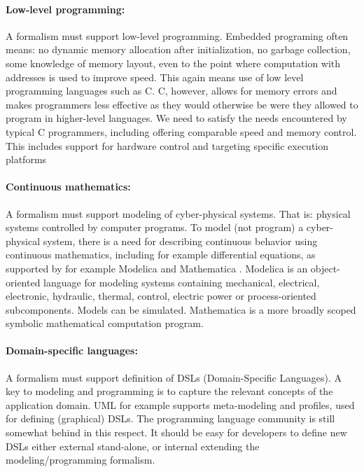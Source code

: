 \paragraph{Low-level programming:}

A formalism must support low-level programming.
Embedded programing often means: no dynamic memory 
allocation after initialization, no garbage collection, some 
knowledge of memory layout, even to the point where computation 
with addresses is used to improve speed. This again means use of 
low level programming languages such as C. C, however, allows for 
memory errors and makes programmers less effective as they would 
otherwise be were they allowed to program in higher-level 
languages. We need to satisfy the needs encountered by typical C 
programmers, including offering comparable speed and memory 
control. This includes support for hardware control and
targeting specific execution platforms 


\paragraph{Continuous mathematics:}

A formalism must support modeling of cyber-physical systems. That
is: physical systems controlled by computer programs. To model (not program) a cyber-physical system, there is a need for describing
continuous behavior using continuous mathematics, including
for example differential equations, as supported by for example
Modelica \cite{Elmqvist-Modelica-2009,modelica-standard}
and Mathematica \cite{mathematica}. 
Modelica is an object-oriented language for modeling systems containing mechanical, electrical, electronic, hydraulic, thermal, control, electric power or process-oriented subcomponents. Models can be simulated. Mathematica is a more broadly scoped symbolic mathematical computation program.


\paragraph{Domain-specific languages:}

A formalism must support definition of DSLs (Domain-Specific 
Languages). A key to modeling and programming is to capture 
the relevant concepts of the application domain. UML for example
supports meta-modeling and profiles, used for defining (graphical)
DSLs. The programming language community is still somewhat behind
in this respect. It should be easy for developers to define new
DSLs either external stand-alone, or internal extending the
modeling/programming formalism.

